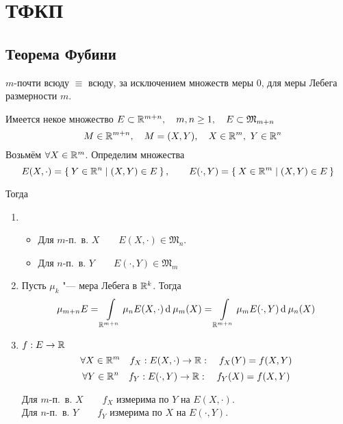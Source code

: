 \chapter{ТФКП}

\section{Теорема Фубини}

\begin{notation}
	$ m $-почти всюду $ \equiv $ всюду, за исключением множеств меры 0, для меры Лебега размерности $ m $.
\end{notation}

\begin{theorem}
	Имеется некое множество $ E \subset \mathbb{R}^{m + n}, \quad m, n \ge 1, \quad E \subset \mathfrak M_{m + n} $
	$$ \quad M \in \mathbb{R}^{m + n}, \quad M = (X, Y), \quad X \in \mathbb{R}^m, ~ Y \in \mathbb{R}^n $$
	Возьмём $ \forall X \in \mathbb{R}^m $. Определим множества
	$$ E (X, \cdot) = \Set{ Y \in \ensuremath{\mathbb{R}}^n \mid (X, Y) \in E}, \qquad E(\cdot, Y) = \Set{X \in \ensuremath{\mathbb{R}}^m \mid (X, Y) \in E} $$

	Тогда
	\begin{enumerate}
		\item
			\begin{itemize}
			\item Для $ m $-п.~в. $ X \qquad E(X, \cdot) \in \mathfrak M_n $.
			\item Для $ n $-п.~в. $ Y \qquad E(\cdot, Y) \in \mathfrak M_m $
		\end{itemize}
		\item Пусть $ \mu_k $ "--- мера Лебега в $ \mathbb{R}^k $. Тогда
			$$ \mu_{m + n} E = \int\limits_{\mathbb{R}^{m + n}} \mu_n E(X, \cdot) \operatorname{d}^{} \mu_m(X) = \int\limits_{\mathbb{R}^{m + n}} \mu_m E(\cdot, Y) \operatorname{d}^{} \mu_n(X) $$
		\item $ f : E \to \mathbb{R} $
			$$ \forall X \in \mathbb{R}^m \quad f_X : E(X, \cdot) \to \mathbb{R} : \quad f_X(Y) = f(X, Y) $$
			$$ \forall Y \in \mathbb{R}^n \quad f_Y : E(\cdot, Y) \to \mathbb{R} : \quad f_Y(X) = f(X, Y) $$

			Для $ m $-п.~в. $ X \qquad f_X $ измерима по $ Y $ на $ E(X, \cdot) $. \\
			Для $ n $-п.~в. $ Y \qquad f_Y $ измерима по $ X $ на $ E(\cdot, Y) $.
			

\end{enumerate}
\end{theorem}
